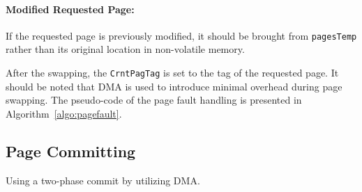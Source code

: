 \paragraph{Modified Requested Page:}  If the requested page is previously modified, it should be brought from \texttt{pagesTemp} rather than its original location in non-volatile memory. 

After the swapping, the \texttt{CrntPagTag} is set to the tag of the requested page. It should be noted that DMA is used to introduce minimal overhead during page swapping. The pseudo-code of the page fault handling is presented in Algorithm~\ref{algo:pagefault}.



\subsection{Page Committing}

Using a two-phase commit by utilizing DMA. 